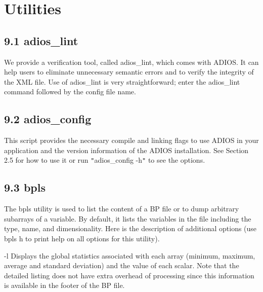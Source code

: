 \chapter{Utilities}

\section*{{\large 9.1 }{\large \textbf{ \label{HToc84890279}\label{HToc212016655}\label{HToc212016897}\label{HToc182553426}adios\_lint}}}

We provide a verification tool, called adios\_lint, which comes with ADIOS. It 
can help users to eliminate unnecessary semantic errors and to verify the integrity 
of the XML file. Use of adios\_lint is very straightforward; enter the adios\_lint 
command followed by the config file name.\label{HToc82067529}\label{HToc84890280}\label{HToc212016656}\label{HToc212016898}\label{HToc182553427}

\section*{{\large 9.2 }{\large \textbf{adios\_config}}}

This script provides the necessary compile and linking flags to use ADIOS in your 
application and the version information of the ADIOS installation.  See Section 
2.5 for how to use it or run \texttt{"}adios\_config -h\texttt{"} to see the options. 
\label{HToc182553428}

\section*{{\large 9.3 }{\large \textbf{bpls}}}

The bpls utility is used to list the content of a BP file or to dump arbitrary 
subarrays of a variable. By default, it lists the variables in the file including 
the type, name, and dimensionality. Here is the description of additional options 
(use bpls \-{}h to print help on all options for this utility).

\leftskip=36pt
\parindent=-36pt
-l  Displays the global statistics associated with each array (minimum, maximum, 
average and standard deviation) and the value of each scalar. Note that the detailed 
listing does not have extra overhead of processing since this information is available 
in the footer of the BP file. 


